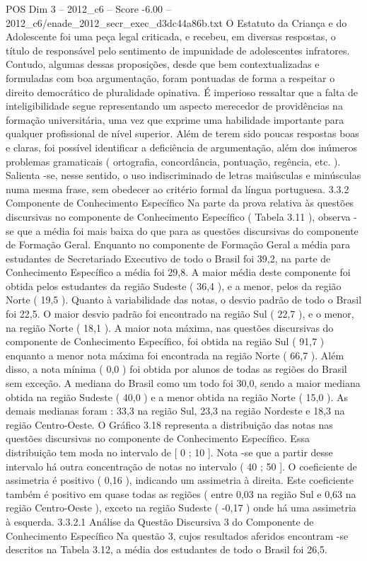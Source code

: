 \begin{textsample}{POS Dim 3 – 2012\_c6 – Score -6.00 – 2012\_c6/enade\_2012\_secr\_exec\_d3dc44a86b.txt}
O Estatuto da Criança e do Adolescente foi uma peça legal criticada, e recebeu, em diversas respostas, o título de responsável pelo sentimento de impunidade de adolescentes infratores.
Contudo, algumas dessas proposições, desde que bem contextualizadas e formuladas com boa argumentação, foram pontuadas de forma a respeitar o direito democrático de pluralidade opinativa.
É imperioso ressaltar que a falta de inteligibilidade segue representando um aspecto merecedor de providências na formação universitária, uma vez que exprime uma habilidade importante para qualquer profissional de nível superior.
Além de terem sido poucas respostas boas e claras, foi possível identificar a deficiência de argumentação, além dos inúmeros problemas gramaticais ( ortografia, concordância, pontuação, regência, etc. ).
Salienta -se, nesse sentido, o uso indiscriminado de letras maiúsculas e minúsculas numa mesma frase, sem obedecer ao critério formal da língua portuguesa. 3.3.2 Componente de Conhecimento Específico Na parte da prova relativa às questões discursivas no componente de Conhecimento Específico ( Tabela 3.11 ), observa -se que a média foi mais baixa do que para as questões discursivas do componente de Formação Geral.
Enquanto no componente de Formação Geral a média para estudantes de Secretariado Executivo de todo o Brasil foi 39,2, na parte de Conhecimento Específico a média foi 29,8.
A maior média deste componente foi obtida pelos estudantes da região Sudeste ( 36,4 ), e a menor, pelos da região Norte ( 19,5 ).
Quanto à variabilidade das notas, o desvio padrão de todo o Brasil foi 22,5.
O maior desvio padrão foi encontrado na região Sul ( 22,7 ), e o menor, na região Norte ( 18,1 ).
A maior nota máxima, nas questões discursivas do componente de Conhecimento Específico, foi obtida na região Sul ( 91,7 ) enquanto a menor nota máxima foi encontrada na região Norte ( 66,7 ).
Além disso, a nota mínima ( 0,0 ) foi obtida por alunos de todas as regiões do Brasil sem exceção.
A mediana do Brasil como um todo foi 30,0, sendo a maior mediana obtida na região Sudeste ( 40,0 ) e a menor obtida na região Norte ( 15,0 ).
As demais medianas foram : 33,3 na região Sul, 23,3 na região Nordeste e 18,3 na região Centro-Oeste.
O Gráfico 3.18 representa a distribuição das notas nas questões discursivas no componente de Conhecimento Específico.
Essa distribuição tem moda no intervalo de [ 0 ; 10 ].
Nota -se que a partir desse intervalo há outra concentração de notas no intervalo ( 40 ; 50 ].
O coeficiente de assimetria é positivo ( 0,16 ), indicando um assimetria à direita.
Este coeficiente também é positivo em quase todas as regiões ( entre 0,03 na região Sul e 0,63 na região Centro-Oeste ), exceto na região Sudeste ( -0,17 ) onde há uma assimetria à esquerda. 3.3.2.1 Análise da Questão Discursiva 3 do Componente de Conhecimento Específico Na questão 3, cujos resultados aferidos encontram -se descritos na Tabela 3.12, a média dos estudantes de todo o Brasil foi 26,5.

\end{textsample}

